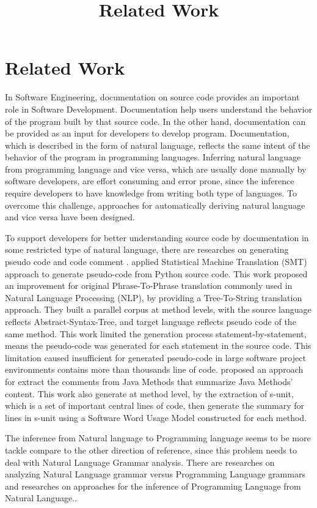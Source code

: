 \documentclass[english]{lipics-v2016}
\title{Related Work}
\begin{document}
\section{Related Work}

In Software Engineering, documentation on source code provides an important role in Software Development. Documentation help users understand the behavior of the program built by that source code. In the other hand, documentation can be provided as an input for developers to develop program. Documentation, which is described in the form of natural language, reflects the same intent of the behavior of the program in programming languages. Inferring natural language from programming language and vice versa, which are usually done manually by software developers, are effort consuming and error prone, since the inference require developers to have knowledge from writing both type of languages. To overcome this challenge, approaches for automatically deriving natural language and vice versa have been designed.

To support developers for better understanding source code by documentation in some restricted type of natural language, there are researches on generating pseudo code \cite{p2} and code comment \cite{p24}.  \cite{p2} applied Statistical Machine Translation (SMT) approach to generate pseudo-code from Python source code. This work proposed an improvement for original Phrase-To-Phrase translation commonly used in Natural Language Processing (NLP), by providing a Tree-To-String translation approach. They built a parallel corpus at method levels, with the source language reflects Abstract-Syntax-Tree, and target language reflects pseudo code of the same method. This work limited the generation process statement-by-statement, means the pseudo-code was generated for each statement in the source code. This limitation caused insufficient for generated pseudo-code in large software project environments contains more than thousands line of code. \cite{p24} proposed an approach for extract the comments from Java Methods that summarize Java Methods’ content. This work also generate at method level, by the extraction of  s-unit, which is a set of important central lines of code, then generate the summary for lines in s-unit using a Software Word Usage Model constructed for each method.

The inference from Natural language to Programming language seems to be more tackle compare to the other direction of reference, since this problem needs to deal with Natural Language Grammar analysis. There are researches on analyzing Natural Language grammar versus Programming Language grammars and researches on approaches for the inference of Programming Language from Natural Language..
\end{document}
